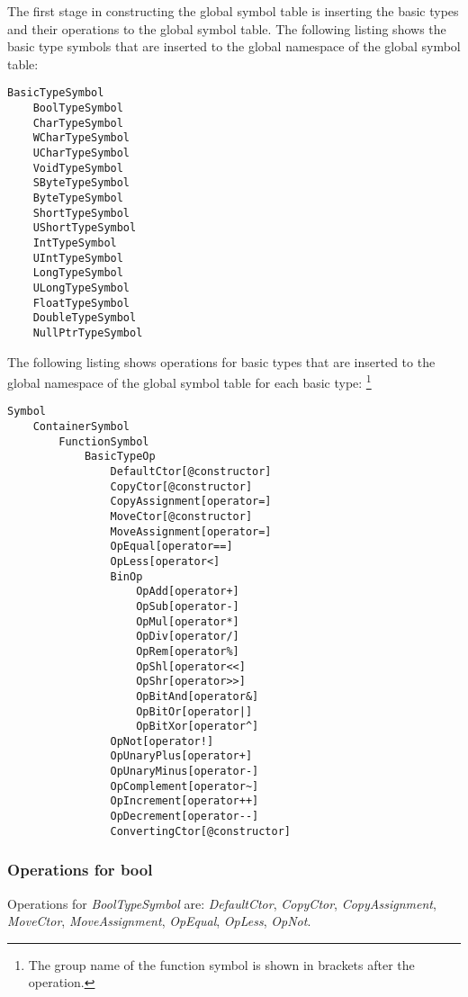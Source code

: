 \documentclass[a4paper,oneside,11pt]{book}
\theoremstyle{definition}
\begin{document}
The first stage in constructing the global symbol table is inserting the basic types and their operations to the global symbol table.
The following listing shows the basic type symbols that are inserted to the global namespace of the global symbol table:

\begin{verbatim}
BasicTypeSymbol
    BoolTypeSymbol
    CharTypeSymbol
    WCharTypeSymbol
    UCharTypeSymbol
    VoidTypeSymbol
    SByteTypeSymbol
    ByteTypeSymbol
    ShortTypeSymbol
    UShortTypeSymbol
    IntTypeSymbol
    UIntTypeSymbol
    LongTypeSymbol
    ULongTypeSymbol
    FloatTypeSymbol
    DoubleTypeSymbol
    NullPtrTypeSymbol
\end{verbatim}

The following listing shows operations for basic types that are inserted to the global namespace of the global symbol table for each basic type:
\footnote{The group name of the function symbol is shown in brackets after the operation.}

\begin{verbatim}
Symbol
    ContainerSymbol
        FunctionSymbol
            BasicTypeOp
                DefaultCtor[@constructor]
                CopyCtor[@constructor]
                CopyAssignment[operator=]
                MoveCtor[@constructor]
                MoveAssignment[operator=]
                OpEqual[operator==]
                OpLess[operator<]
                BinOp
                    OpAdd[operator+]
                    OpSub[operator-]
                    OpMul[operator*]
                    OpDiv[operator/]
                    OpRem[operator%]
                    OpShl[operator<<]
                    OpShr[operator>>]
                    OpBitAnd[operator&]
                    OpBitOr[operator|]
                    OpBitXor[operator^]
                OpNot[operator!]
                OpUnaryPlus[operator+]
                OpUnaryMinus[operator-]
                OpComplement[operator~]
                OpIncrement[operator++]
                OpDecrement[operator--]
                ConvertingCtor[@constructor]
\end{verbatim}

\subsubsection{Operations for \textbf{bool}}

Operations for \emph{BoolTypeSymbol} are: \emph{DefaultCtor}, \emph{CopyCtor}, \emph{CopyAssignment}, \emph{MoveCtor}, \emph{MoveAssignment},
\emph{OpEqual}, \emph{OpLess}, \emph{OpNot}.
\end{document}
